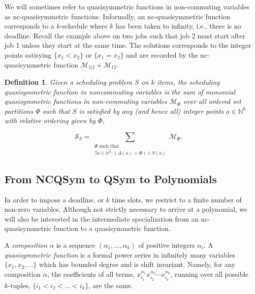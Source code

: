 \documentclass[12pt,reqno]{amsart}
\newtheorem{definition}{Definition}
\numberwithin{definition}{section}
\theoremstyle{definition}
\newcommand{\NN}{\mathbb{N}}
\newcommand{\ncS}{\mathcal{S}}
\newcommand{\ncM}{\mathcal{M}}
\begin{document}
We will sometimes refer to quasisymmetric functions in non-commuting
variables as nc-quasisymmetric functions.  Informally, an
nc-quasisymmetric function corresponds to a $k$-schedule where $k$ has
been taken to infinity, i.e., there is no deadline.  Recall the example
above on two jobs such that job 2 must start after job 1 unless they
start at the same time.  The solutions corresponds to the integer points satisying $\{x_1 < x_2\}$ or $\{x_1 = x_2\}$ and are recorded by the
nc-quasisymmetric function $\ncM_{1|2} + \ncM_{12}$.

\begin{definition}
Given a scheduling problem $S$ on $k$ items, the scheduling quasisymmetric function in noncommuting variables is the sum of monomial quasisymmetric functions in non-commuting variables $\ncM_{\Phi}$ over all ordered set partitions ${\Phi}$ such that $S$ is satisfied by any (and hence all) integer points $a \in \mathbb{N}^k$ with relative ordering given by $\Phi$,

$$ \ncS_S = \sum_{\substack{\Phi \text{ such that } \\ \exists a\in\NN^k: (\Delta(a) =\Phi) \wedge S(a)}} \ncM_{\Phi}.  $$


\end{definition}





\subsection{From NCQSym to QSym to Polynomials}


 In order to impose a deadline, or $k$ time slots, we restrict to
 a finite number of non-zero variables.
Although not strictly necessary to arrive at a polynomial, we will also be interested in the intermediate specialization from an nc-quasisymmetric function to a quasisymmetric function.  


A \emph{composition} $\alpha$ is a sequence $(\alpha_1,\ldots,\alpha_k)$ of positive integers $\alpha_i$. A \emph{quasisymmetric function} is a formal power series in infinitely many
variables $\{x_1, x_2, \ldots \}$ which has bounded degree and is shift invariant.  Namely, for
any composition $\alpha$, the coefficients of all terms,
$x_{i_1}^{\alpha_1}x_{i_2}^{\alpha_2} \cdots x_{i_k}^{\alpha_k}$,
running over all possible $k$-tuples, $\{i_1 < i_2 < \ldots < i_k \}$, are
the same.
\end{document}
